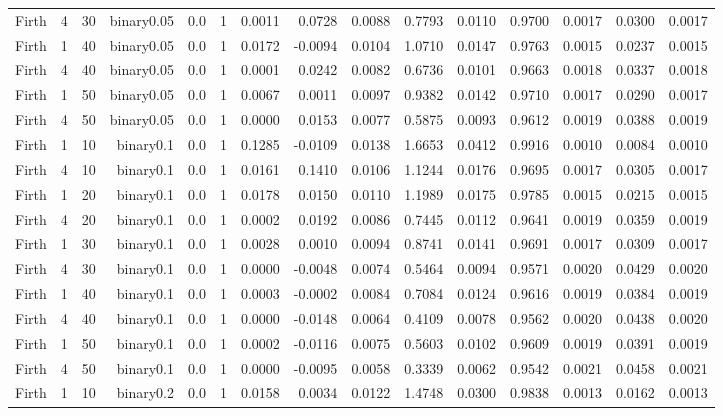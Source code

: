 \begin{longtable}{rrrrrrrrrrrrrrr}
  Firth & 4 & 30 & binary0.05 & 0.0 & 1 & 0.0011 & 0.0728 & 0.0088 & 0.7793 & 0.0110 & 0.9700 & 0.0017 & 0.0300 & 0.0017 \\ 
  Firth & 1 & 40 & binary0.05 & 0.0 & 1 & 0.0172 & -0.0094 & 0.0104 & 1.0710 & 0.0147 & 0.9763 & 0.0015 & 0.0237 & 0.0015 \\ 
  Firth & 4 & 40 & binary0.05 & 0.0 & 1 & 0.0001 & 0.0242 & 0.0082 & 0.6736 & 0.0101 & 0.9663 & 0.0018 & 0.0337 & 0.0018 \\ 
  Firth & 1 & 50 & binary0.05 & 0.0 & 1 & 0.0067 & 0.0011 & 0.0097 & 0.9382 & 0.0142 & 0.9710 & 0.0017 & 0.0290 & 0.0017 \\ 
  Firth & 4 & 50 & binary0.05 & 0.0 & 1 & 0.0000 & 0.0153 & 0.0077 & 0.5875 & 0.0093 & 0.9612 & 0.0019 & 0.0388 & 0.0019 \\ 
  Firth & 1 & 10 & binary0.1 & 0.0 & 1 & 0.1285 & -0.0109 & 0.0138 & 1.6653 & 0.0412 & 0.9916 & 0.0010 & 0.0084 & 0.0010 \\ 
  Firth & 4 & 10 & binary0.1 & 0.0 & 1 & 0.0161 & 0.1410 & 0.0106 & 1.1244 & 0.0176 & 0.9695 & 0.0017 & 0.0305 & 0.0017 \\ 
  Firth & 1 & 20 & binary0.1 & 0.0 & 1 & 0.0178 & 0.0150 & 0.0110 & 1.1989 & 0.0175 & 0.9785 & 0.0015 & 0.0215 & 0.0015 \\ 
  Firth & 4 & 20 & binary0.1 & 0.0 & 1 & 0.0002 & 0.0192 & 0.0086 & 0.7445 & 0.0112 & 0.9641 & 0.0019 & 0.0359 & 0.0019 \\ 
  Firth & 1 & 30 & binary0.1 & 0.0 & 1 & 0.0028 & 0.0010 & 0.0094 & 0.8741 & 0.0141 & 0.9691 & 0.0017 & 0.0309 & 0.0017 \\ 
  Firth & 4 & 30 & binary0.1 & 0.0 & 1 & 0.0000 & -0.0048 & 0.0074 & 0.5464 & 0.0094 & 0.9571 & 0.0020 & 0.0429 & 0.0020 \\ 
  Firth & 1 & 40 & binary0.1 & 0.0 & 1 & 0.0003 & -0.0002 & 0.0084 & 0.7084 & 0.0124 & 0.9616 & 0.0019 & 0.0384 & 0.0019 \\ 
  Firth & 4 & 40 & binary0.1 & 0.0 & 1 & 0.0000 & -0.0148 & 0.0064 & 0.4109 & 0.0078 & 0.9562 & 0.0020 & 0.0438 & 0.0020 \\ 
  Firth & 1 & 50 & binary0.1 & 0.0 & 1 & 0.0002 & -0.0116 & 0.0075 & 0.5603 & 0.0102 & 0.9609 & 0.0019 & 0.0391 & 0.0019 \\ 
  Firth & 4 & 50 & binary0.1 & 0.0 & 1 & 0.0000 & -0.0095 & 0.0058 & 0.3339 & 0.0062 & 0.9542 & 0.0021 & 0.0458 & 0.0021 \\ 
  Firth & 1 & 10 & binary0.2 & 0.0 & 1 & 0.0158 & 0.0034 & 0.0122 & 1.4748 & 0.0300 & 0.9838 & 0.0013 & 0.0162 & 0.0013 \\ 

\end{longtable}

